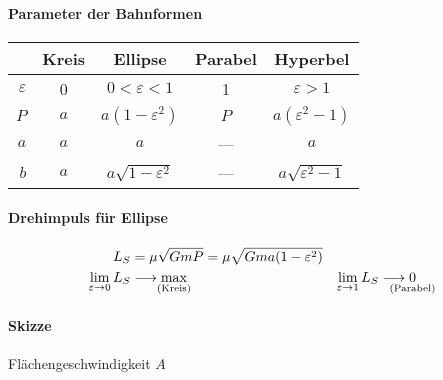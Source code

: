 \paragraph{Parameter der Bahnformen}
\begin{center}
    \begin{tabular}{r|cccc}
                        & \textbf{Kreis}    & \textbf{Ellipse}          & \textbf{Parabel}  & \textbf{Hyperbel} \\\hline
        $\varepsilon$   & 0                 & $0 < \varepsilon < 1$     & 1                 & $\varepsilon > 1$\\
        $P$             & $a$               & $a (1 - \varepsilon^2)$   & $P$               & $a(\varepsilon^2 - 1)$\\
        $a$             & $a$               & $a$                       & ---               & $a$\\
        $b$             & $a$               & $a\sqrt{1 - \varepsilon^ 2}$ & ---            & $a \sqrt{\varepsilon^2-1}$
    \end{tabular}
\end{center}

\paragraph{Drehimpuls für Ellipse}
\begin{align*}
    L_S &= \mu \sqrt{GmP} = \mu \sqrt{Gma(1-\varepsilon^2)} \\
    \lim\limits_{\varepsilon \to 0} L_S &\longrightarrow \max\limits_{\mathclap{\text{(Kreis)}}} & \lim\limits_{\varepsilon \to 1} L_S &\longrightarrow \underset{\mathclap{\text{(Parabel)}}}0
\end{align*}

\paragraph{Skizze} Flächengeschwindigkeit $A$
\begin{center}
\end{center}

